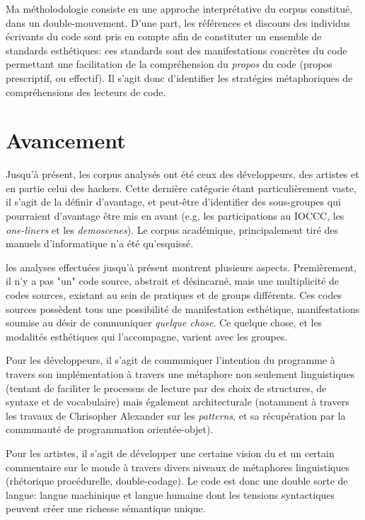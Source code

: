 \documentclass{article}
\begin{document}
Ma métholodologie consiste en une approche interprétative du corpus constitué, dans un double-mouvement. D'une part, les références et discours des individus écrivants du code sont pris en compte afin de constituter un ensemble de standards esthétiques: ces standards sont des manifestations concrètes du code permettant une facilitation de la compréhension du \emph{propos} du code (propos prescriptif, ou effectif). Il s'agit donc d'identifier les stratégies métaphoriques de compréhensions des lecteurs de code.

\section{Avancement}

Jusqu'à présent, les corpus analysés ont été ceux des développeurs, des artistes et en partie celui des hackers. Cette dernière catégorie étant particulièrement vaste, il s'agit de la définir d'avantage, et peut-être d'identifier des sous-groupes qui pourraient d'avantage être mis en avant (e.g. les participations au IOCCC, les \emph{one-liners} et les \emph{demoscenes}). Le corpus académique, principalement tiré des manuels d'informatique n'a été qu'esquissé.

les analyses effectuées jusqu'à présent montrent plusieurs aspects. Premièrement, il n'y a pas "un" code source, abstrait et désincarné, mais une multiplicité de codes sources, existant au sein de pratiques et de groups différents. Ces codes sources possèdent tous une possibilité de manifestation esthétique, manifestations soumise au désir de communiquer \emph{quelque chose}. Ce quelque chose, et les modalités esthétiques qui l'accompagne, varient avec les groupes.

Pour les développeurs, il s'agit de communiquer l'intention du programme à travers son implémentation à travers une métaphore non seulement linguistiques (tentant de faciliter le processus de lecture par des choix de structures, de syntaxe et de vocabulaire) mais également architecturale (notamment à travers les travaux de Chrisopher Alexander sur les \emph{patterns}, et sa récupération par la communauté de programmation orientée-objet).

Pour les artistes, il s'agit de développer une certaine vision du et un certain commentaire sur le monde à travers divers niveaux de métaphores linguistiques (rhétorique procédurelle\cite{bogost_rhetoric_2007}, double-codage\cite{cox_speaking_2013}). Le code est donc une double sorte de langue: langue machinique et langue humaine dont les tensions syntactiques peuvent créer une richesse sémantique unique.
\end{document}
